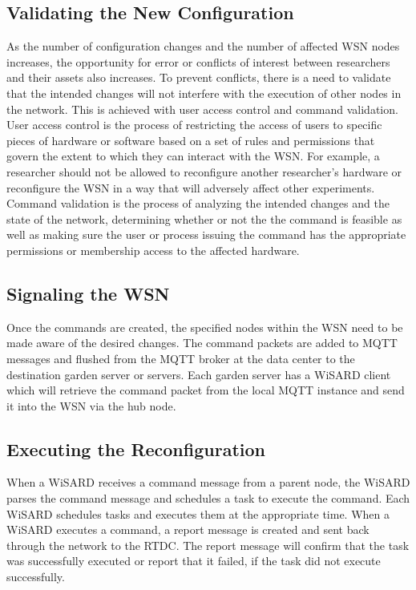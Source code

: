 \subsection{Validating the New Configuration}
As the number of configuration changes and the number of affected WSN nodes increases, the opportunity for error or conflicts of interest between researchers and their assets also increases. To prevent conflicts, there is a need to validate that the intended changes will not interfere with the execution of other nodes in the network. This is achieved with user access control and command validation. User access control is the process of restricting the access of users to specific pieces of hardware or software based on a set of rules and permissions that govern the extent to which they can interact with the WSN. For example, a researcher should not be allowed to reconfigure another researcher's hardware or reconfigure the WSN in a way that will adversely affect other experiments. Command validation is the process of analyzing the intended changes and the state of the network, determining whether or not the the command is feasible as well as making sure the user  or process issuing the command has the appropriate permissions or membership access to the affected hardware.

\subsection{Signaling the WSN}
Once the commands are created, the specified nodes within the WSN need to be made aware of the desired changes. The command packets are added to MQTT messages and flushed from the MQTT broker at the data center to the destination garden server or servers. Each garden server has a WiSARD client which will retrieve the command packet from the local MQTT instance and send it into the WSN via the hub node. 

\subsection{Executing the Reconfiguration}
When a WiSARD receives a command message from a parent node, the WiSARD parses the command message and schedules a task to execute the command. Each WiSARD schedules tasks and executes them at the appropriate time. When a WiSARD executes a command, a report message is created and sent back through the network to the RTDC. The report message will confirm that the task was successfully executed or report that it failed, if the task did not execute successfully.

